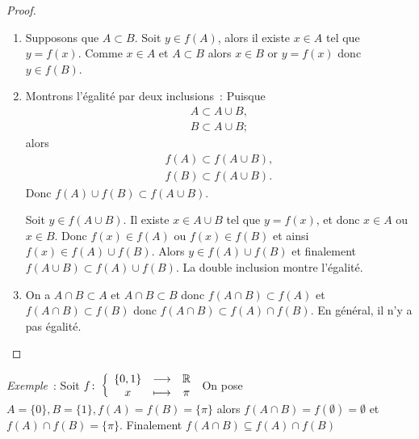 \begin{proof}
  \begin{enumerate}
  \item Supposons que \(A \subset B\). Soit \(y \in f(A)\), alors il existe \(x \in A\) tel que \(y=f(x)\). Comme \(x \in A\) et \(A \subset B\) alors \(x \in B\) or \(y=f(x)\) donc \(y \in f(B)\).
  \item Montrons l'égalité par deux inclusions~: Puisque
      \begin{gather}
        A \subset A \cup B, \\
        B \subset A \cup B;
      \end{gather}
      alors
      \begin{gather}
        f(A) \subset f(A \cup B), \\
        f(B) \subset f(A \cup B).
      \end{gather}
      Donc \(f(A) \cup f(B) \subset f(A \cup B)\).
      
      Soit \(y \in f(A \cup B)\). Il existe \(x \in A \cup B\) tel que \(y=f(x)\), et donc \(x \in A\) ou \(x \in B\). Donc \(f(x) \in f(A)\) ou \(f(x) \in f(B)\) et ainsi \(f(x) \in f(A) \cup  f(B)\). Alors \(y \in f(A) \cup f(B)\) et finalement \(f(A \cup B) \subset f(A) \cup f(B)\). La double inclusion montre l'égalité.
  \item On a \(A \cap B \subset A\) et \(A \cap B \subset B\) donc \(f(A \cap B) \subset f(A)\) et \(f(A \cap B) \subset f(B)\) donc \(f(A \cap B) \subset f(A) \cap f(B)\). En général, il n'y a pas égalité.
  \end{enumerate}
\end{proof}
%
\emph{Exemple}~: Soit \(f\colon \left\{\begin{array}{ccc} \{0,1\} & \longrightarrow &\mathbb{R}\\ x & \longmapsto & \pi \end{array} \right.\) On pose \(A=\{0\}, B=\{1\}, f(A)=f(B)=\{\pi\}\) alors \(f(A \cap B)=f(\emptyset)=\emptyset\) et \(f(A) \cap f(B)=\{\pi\}\). Finalement \(f(A \cap B) \subseteq f(A) \cap f(B)\)

